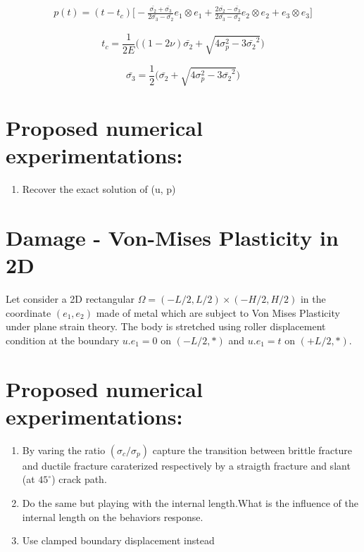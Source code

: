 \documentclass[10pt,oneside]{report}
\begin{document}
\begin{equation}
\begin{split}
\label{eq:UsolVonMises3D}
p(t)= (t-t_c) \Big[ -\frac{\bar{\sigma_2}+\bar{\sigma_3}}{2\bar{\sigma_3}-\bar{\sigma_2}} e_1 \otimes e_1 + \frac{2\bar{\sigma_2}-\bar{\sigma_3}}{2\bar{\sigma_3}-\bar{\sigma_2}} e_2\otimes e_2 + e_3\otimes e_3 \Big]
\end{split}
\end{equation}


$$t_c = \frac{1}{2E} \Big( (1-2\nu)\bar{\sigma_2} + \sqrt{4\sigma_p^2- 3\bar{\sigma_2}^2} \Big) $$


$$ \bar{\sigma_3}= \frac{1}{2} \Big( \bar{\sigma_2} + \sqrt{4\sigma_p^2-3\bar{\sigma_2}^2} \Big) $$

\section*{Proposed numerical experimentations:}
\begin{enumerate}
\item Recover the exact solution of (u, p)
\end{enumerate}


\section{Damage - Von-Mises Plasticity in 2D}
Let consider a 2D rectangular $\Omega= (-L/2,L/2) \times (-H/2,H/2)$ in the coordinate $(e_1, e_2)$ made of metal which are subject to Von Mises Plasticity under plane strain theory. The body is stretched using roller displacement condition at the boundary $u.e_1 = 0$ on $(-L/2,*)$ and $u.e_1 = t$ on $(+L/2,*)$.

\section*{Proposed numerical experimentations:}

\begin{enumerate}
\item By varing the ratio $(\sigma_c/\sigma_p)$ capture the transition between brittle fracture and ductile fracture caraterized respectively by a straigth fracture and slant (at $45^\circ$) crack path.
\item Do the same but playing with the internal length.What is the influence of the internal length on the behaviors response.
\item Use clamped boundary displacement instead
\end{enumerate}
\end{document}

